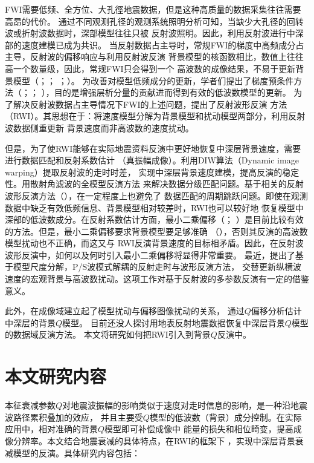 FWI需要低频、全方位、大孔徑地震数据，但是这种高质量的数据采集往往需要高昂的代价。
通过不同观测孔径的观测系统照明分析可知，当缺少大孔径的回转波或折射波数据时，深部模型往往只被
反射波照明。因此，利用反射波进行中深部的速度建模已成为共识。
当反射数据占主导时，常规FWI的梯度中高频成分占主导，反射波的偏移响应与利用反射波反演
背景模型的核函数相比，数值上往往高一个数量级，因此，常规FWI只会得到一个
高波数的成像结果，不易于更新背景模型（；；
；）。
为改善对模型低频成分的更新，学者们提出了梯度预条件方法（；；
），目的是增强层析分量的贡献进而得到有效的低波数模型的更新。
为了解决反射波数据占主导情况下FWI的上述问题，提出了反射波形反演
方法（RWI）。其思想在于：将速度模型分解为背景模型和扰动模型两部分，利用反射波数据侧重更新
背景速度而非高波数的速度扰动。

但是，为了使RWI能够在实际地震资料反演中更好地恢复中深层背景速度，需要进行数据匹配和反射系数估计
（真振幅成像）。利用DIW算法（Dynamic image warping）提取反射波的走时时差，
实现中深层背景速度建模，提高反演的稳定性。用散射角滤波的全模型反演方法
来解决数据分级匹配问题。基于相关的反射波形反演方法（），在一定程度上也避免了
数据匹配的周期跳跃问题。即使在观测数据中缺乏有效低频信息、背景模型相对较差时，RWI也可以较好地
恢复模型中深部的低波数成分。在反射系数估计方面，最小二乘偏移（；
）是目前比较有效的方法。但是，最小二乘偏移要求背景模型要足够准确
（），否则其反演的高波数模型扰动也不正确，而这又与
RWI反演背景速度的目标相矛盾。因此，在反射波波形反演中，如何以及何时引入最小二乘偏移将显得非常重要。
最近，提出了基于模型尺度分解，P/S波模式解耦的反射走时与波形反演方法，
交替更新纵横波速度的宏观背景与高波数扰动。这项工作对基于反射波的多参数反演有一定的借鉴意义。

此外，在成像域建立起了模型扰动与偏移图像扰动的关系，
通过$Q$偏移分析估计中深层的背景$Q$模型。
目前还没人探讨用地表反射地震数据恢复中深层背景$Q$模型的数据域反演方法。
本文将研究如何把RWI引入到背景$Q$反演中。

\vspace{1.0cm}
\section{本文研究内容}

本征衰减参数$Q$对地震波振幅的影响类似于速度对走时信息的影响，是一种沿地震波路径累积叠加的效应，
并且主要受$Q$模型的低波数（背景）成分控制。在实际应用中，相对准确的背景$Q$模型即可补偿成像中
能量的损失和相位畸变，提高成像分辨率。本文结合地震衰减的具体特点，在RWI的框架下
，实现中深层背景衰减模型的反演。具体研究内容包括：

